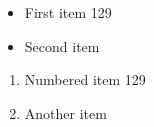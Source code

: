 \documentclass{article}
\begin{document}
\begin{itemize}
\item First item 129
\item Second item
\end{itemize}
\begin{enumerate}
\item Numbered item 129
\item Another item
\end{enumerate}
\end{document}
